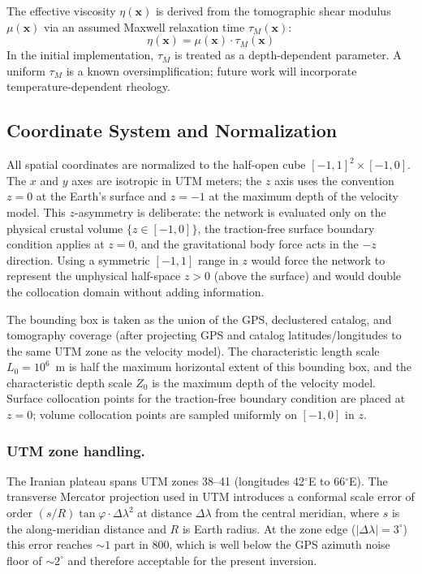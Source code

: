 \documentclass[11pt, a4paper]{article}
\begin{document}
The effective viscosity $\eta(\mathbf{x})$ is derived from the tomographic shear modulus $\mu(\mathbf{x})$ via an assumed Maxwell relaxation time $\tau_M(\mathbf{x})$:
\begin{equation}
    \eta(\mathbf{x}) = \mu(\mathbf{x}) \cdot \tau_M(\mathbf{x})
    \label{eq:viscosity}
\end{equation}
In the initial implementation, $\tau_M$ is treated as a depth-dependent parameter. A uniform $\tau_M$ is a known oversimplification; future work will incorporate temperature-dependent rheology.

\subsection{Coordinate System and Normalization}
\label{sec:coords}
All spatial coordinates are normalized to the half-open cube $[-1, 1]^2 \times [-1, 0]$. The $x$ and $y$ axes are isotropic in UTM meters; the $z$ axis uses the convention $z = 0$ at the Earth's surface and $z = -1$ at the maximum depth of the velocity model. This $z$-asymmetry is deliberate: the network is evaluated only on the physical crustal volume $\{z \in [-1, 0]\}$, the traction-free surface boundary condition applies at $z = 0$, and the gravitational body force acts in the $-z$ direction. Using a symmetric $[-1, 1]$ range in $z$ would force the network to represent the unphysical half-space $z > 0$ (above the surface) and would double the collocation domain without adding information.

The bounding box is taken as the union of the GPS, declustered catalog, and tomography coverage (after projecting GPS and catalog latitudes/longitudes to the same UTM zone as the velocity model). The characteristic length scale $L_0 = 10^6$~m is half the maximum horizontal extent of this bounding box, and the characteristic depth scale $Z_0$ is the maximum depth of the velocity model. Surface collocation points for the traction-free boundary condition are placed at $z = 0$; volume collocation points are sampled uniformly on $[-1, 0]$ in $z$.

\subsubsection*{UTM zone handling.}
The Iranian plateau spans UTM zones 38--41 (longitudes 42$^\circ$E to 66$^\circ$E). The transverse Mercator projection used in UTM introduces a conformal scale error of order $(s/R)\tan\varphi \cdot \Delta\lambda^2$ at distance $\Delta\lambda$ from the central meridian, where $s$ is the along-meridian distance and $R$ is Earth radius. At the zone edge ($|\Delta\lambda| = 3^\circ$) this error reaches $\sim 1$ part in 800, which is well below the GPS azimuth noise floor of $\sim 2^\circ$ and therefore acceptable for the present inversion.
\end{document}
